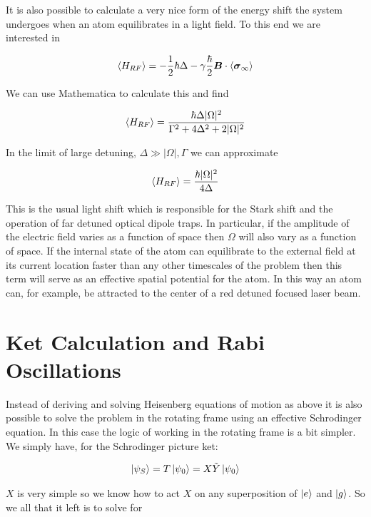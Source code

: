 \documentclass[12pt]{article}
\newcommand{\bv}[1]{\boldsymbol{#1}}
\begin{document}
It is also possible to calculate a very nice form of the energy shift the system undergoes when an atom equilibrates in a light field. To this end we are interested in

\begin{align}
\Braket{H_{RF}} = -\frac{1}{2}\hbar \Delta - \gamma \frac{\hbar}{2} \bv{B}\cdot \Braket{\bv{\sigma}_{\infty}}
\end{align}

We can use Mathematica to calculate this and find

\begin{align}
\Braket{H_{RF}} = \frac{\hbar \Delta |\Omega|^2}{\Gamma^2 + 4\Delta^2 + 2|\Omega|^2}
\end{align}

In the limit of large detuning, $\Delta \gg |\Omega|,\Gamma$ we can approximate

\begin{align}
\Braket{H_{RF}} = \frac{\hbar |\Omega|^2}{4 \Delta}
\end{align}

This is the usual light shift which is responsible for the Stark shift and the operation of far detuned optical dipole traps. In particular, if the amplitude of the electric field varies as a function of space then $\Omega$ will also vary as a function of space. If the internal state of the atom can equilibrate to the external field at its current location faster than any other timescales of the problem then this term will serve as an effective spatial potential for the atom. In this way an atom can, for example, be attracted to the center of a red detuned focused laser beam.

\section{Ket Calculation and Rabi Oscillations}

Instead of deriving and solving Heisenberg equations of motion as above it is also possible to solve the problem in the rotating frame using an effective Schrodinger equation. In this case the logic of working in the rotating frame is a bit simpler. We simply have, for the Schrodinger picture ket:

\begin{align}
\ket{\psi_S} = T\ket{\psi_0} = X\tilde{Y} \ket{\psi_0}
\end{align}

$X$ is very simple so we know how to act $X$ on any superposition of $\ket{e}$ and $\ket{g}$. So we all that it left is to solve for 
\end{document}
